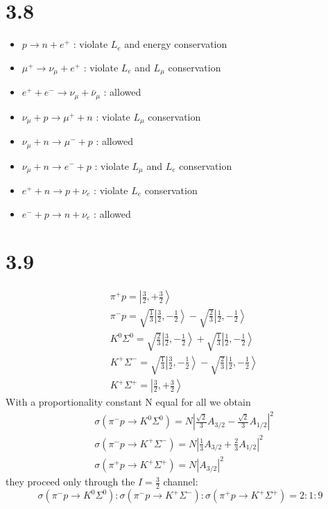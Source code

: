 \documentclass{article}
\begin{document}
\begin{CJK*}{GBK}{song}
\section{3.8}
\begin{itemize}
\item $p\rightarrow n+e^+$  :  violate $L_e$ and energy conservation
\item $\mu^+\rightarrow\nu_{\mu}+e^+$  :  violate $L_e$ and $L_{\mu}$ conservation
\item $e^++e^-\rightarrow \nu_{\mu}+\bar{\nu}_{\mu}$  :  allowed
\item $\nu_{\mu}+p\rightarrow \mu^++n$  :  violate $L_{\mu}$ conservation 
\item $\nu_{\mu}+n\rightarrow \mu^-+p$  :  allowed
\item $\nu_{\mu}+n\rightarrow e^-+p$  :  violate $L_{\mu}$ and $L_e$ conservation 
\item $e^++n\rightarrow p+\nu_e$  :  violate $L_e$ conservation
\item $e^-+p\rightarrow n+\nu_e$  :  allowed
\end{itemize}

\section{3.9}
\begin{equation}
\begin{aligned}
&\pi^+p=\left|\frac{3}{2},+\frac{3}{2}\right\rangle\\
&\pi^-p=\sqrt{\frac{1}{3}}\left|\frac{3}{2},-\frac{1}{2}\right\rangle-\sqrt{\frac{2}{3}}\left|\frac{1}{2},-\frac{1}{2}\right\rangle\\
&K^0\Sigma^0=\sqrt{\frac{2}{3}}\left|\frac{3}{2},-\frac{1}{2}\right\rangle+\sqrt{\frac{1}{3}}\left|\frac{1}{2},-\frac{1}{2}\right\rangle\\
&K^+\Sigma^-=\sqrt{\frac{1}{3}}\left|\frac{3}{2},-\frac{1}{2}\right\rangle-\sqrt{\frac{2}{3}}\left|\frac{1}{2},-\frac{1}{2}\right\rangle\\
&K^+\Sigma^+=\left|\frac{3}{2},+\frac{3}{2}\right\rangle
\end{aligned}
\end{equation}
With a proportionality constant N equal for all we obtain
\begin{equation}
\begin{aligned}
&\sigma(\pi^-p\rightarrow K^0\Sigma^0)=N\left|\frac{\sqrt{2}}{3}A_{3/2}-\frac{\sqrt{2}}{3}A_{1/2}\right|^2\\
&\sigma(\pi^-p\rightarrow K^+\Sigma^-)=N\left|\frac{1}{3}A_{3/2}+\frac{2}{3}A_{1/2}\right|^2\\
&\sigma(\pi^+p\rightarrow K^+\Sigma^+)=N\left|A_{3/2}\right|^2
\end{aligned}
\end{equation}
they proceed only through the $I=\frac{3}{2}$ channel:
\begin{equation}
\sigma(\pi^-p\rightarrow K^0\Sigma^0):\sigma(\pi^-p\rightarrow K^+\Sigma^-):\sigma(\pi^+p\rightarrow K^+\Sigma^+)=2:1:9
\end{equation}


\end{CJK*}
\end{document}
